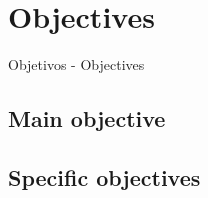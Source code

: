 \chapter{Objectives} %
\label{chap:goals}


Objetivos - Objectives

\section{Main objective}




\section{Specific objectives}




